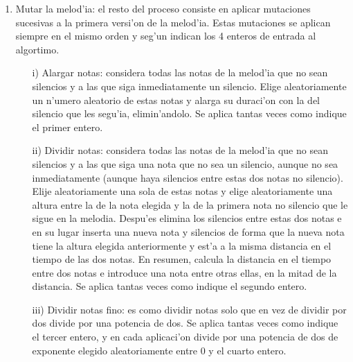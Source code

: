 ﻿\documentclass[a4paper,12pt]{article}
\begin{document}
\begin{enumerate}
        \item Mutar la melod'ia: el resto del proceso consiste en aplicar mutaciones sucesivas a la primera versi'on de la melod'ia. Estas mutaciones se aplican siempre en el mismo orden y seg'un indican los 4 enteros de entrada al algortimo.
                \begin{enumerate}
                \item[i)] Alargar notas: considera todas las notas de la melod'ia que no sean silencios y a las que siga inmediatamente un silencio. Elige aleatoriamente un n'umero aleatorio de estas notas y alarga su duraci'on con la del silencio que les segu'ia, elimin'andolo. Se aplica tantas veces como indique el primer entero.
                \item[ii)] Dividir notas: considera todas las notas de la melod'ia que no sean silencios y a las que siga una nota que no sea un silencio, aunque no sea inmediatamente (aunque haya silencios entre estas dos notas no silencio). Elije aleatoriamente una sola de estas notas y elige aleatoriamente una altura entre la de la nota elegida y la de la primera nota no silencio que le sigue en la melodia. Despu'es elimina los silencios entre estas dos notas e en su lugar inserta una nueva nota y silencios de forma que la nueva nota tiene la altura elegida anteriormente y est'a a la misma distancia en el tiempo de las dos notas. En resumen, calcula la distancia en el tiempo entre dos notas e introduce una nota entre otras ellas, en la mitad de la distancia. Se aplica tantas veces como indique el segundo entero.
                \item[iii)] Dividir notas fino: es como dividir notas solo que en vez de dividir por dos divide por una potencia de dos. Se aplica tantas veces como indique el tercer entero, y en cada aplicaci'on divide por una potencia de dos de exponente elegido aleatoriamente entre 0 y el cuarto entero.
                \end{enumerate}
        \end{enumerate}
\end{document}
